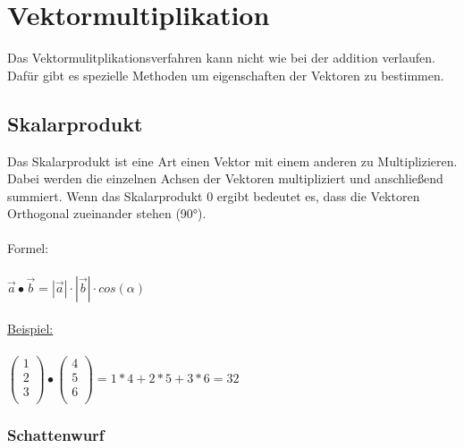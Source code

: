 

\section{Vektormultiplikation}
Das Vektormulitplikationsverfahren kann nicht wie bei der addition verlaufen. 
Dafür gibt es spezielle Methoden um eigenschaften der Vektoren zu bestimmen.

\subsection{Skalarprodukt}
Das Skalarprodukt ist eine Art einen Vektor mit einem anderen zu Multiplizieren.
Dabei werden die einzelnen Achsen der Vektoren multipliziert und anschließend summiert. 
Wenn das Skalarprodukt 0 ergibt bedeutet es, dass die Vektoren Orthogonal zueinander stehen (90°).
\\\\
Formel: \\\\
$
\vec{a} \bullet \vec{b} = |\vec{a}| \cdot |\vec{b}| \cdot cos(\alpha)
$
\\\\
\underline{Beispiel:} \\\\
$
\begin{pmatrix}
    1 \\ 
    2 \\ 
    3 \\
\end{pmatrix}
\bullet
\begin{pmatrix}
    4 \\
    5 \\
    6 \\
\end{pmatrix}
=
1 * 4 + 2 * 5 + 3 * 6
= 
32
$
\subsubsection{Schattenwurf}


